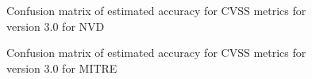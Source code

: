 \documentclass[12pt]{article}
\begin{document}
\begin{figure}[t]
	\centering
	\caption{\label{fig:nvd_30_confusion_matrices}Confusion matrix of estimated accuracy for CVSS metrics for version 3.0 for NVD}
\end{figure}

\begin{figure}[t]
	\centering
	\caption{\label{fig:mitre_30_confusion_matrices}Confusion matrix of estimated accuracy for CVSS
		metrics for version 3.0 for MITRE}
\end{figure}
\end{document}
